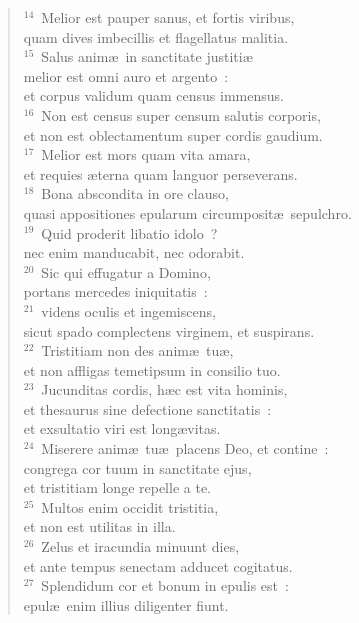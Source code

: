 \begin{verse}${}^{14}$~Melior est pauper sanus, et fortis viribus,\\ quam dives imbecillis et flagellatus malitia.\\
${}^{15}$~Salus anim\ae\ in sanctitate justiti\ae \\ melior est omni auro et argento~:\\ et corpus validum quam census immensus.\\
${}^{16}$~Non est census super censum salutis corporis,\\ et non est oblectamentum super cordis gaudium.\\
${}^{17}$~Melior est mors quam vita amara,\\ et requies \ae terna quam languor perseverans.\\
${}^{18}$~Bona abscondita in ore clauso,\\ quasi appositiones epularum circumposit\ae\ sepulchro.\\
${}^{19}$~Quid proderit libatio idolo~?\\ nec enim manducabit, nec odorabit.\\
${}^{20}$~Sic qui effugatur a Domino,\\ portans mercedes iniquitatis~:\\
${}^{21}$~videns oculis et ingemiscens,\\ sicut spado complectens virginem, et suspirans.\\
${}^{22}$~Tristitiam non des anim\ae\ tu\ae ,\\ et non affligas temetipsum in consilio tuo.\\
${}^{23}$~Jucunditas cordis, h\ae c est vita hominis,\\ et thesaurus sine defectione sanctitatis~:\\ et exsultatio viri est long\ae vitas.\\
${}^{24}$~Miserere anim\ae\ tu\ae\ placens Deo, et contine~:\\ congrega cor tuum in sanctitate ejus,\\ et tristitiam longe repelle a te.\\
${}^{25}$~Multos enim occidit tristitia,\\ et non est utilitas in illa.\\
${}^{26}$~Zelus et iracundia minuunt dies,\\ et ante tempus senectam adducet cogitatus.\\
${}^{27}$~Splendidum cor et bonum in epulis est~:\\ epul\ae\ enim illius diligenter fiunt.\end{verse}


